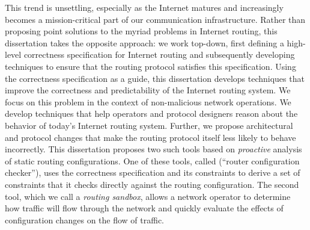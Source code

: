 This trend is unsettling, especially as the Internet matures and
increasingly becomes a mission-critical part of our communication
infrastructure.  Rather than proposing point solutions to the myriad
problems in Internet routing, this dissertation takes the opposite
approach: we work top-down, first defining a high-level correctness
specification for Internet routing and subsequently developing
techniques to ensure that the routing protocol satisfies this
specification.  Using the correctness specification as a guide, this
dissertation develops techniques that improve the correctness and
predictability of the Internet routing system. We focus on
this problem in the context of non-malicious network operations.  We
develop techniques that help operators and protocol designers reason
about the behavior of today's Internet 
routing system.  Further, we propose architectural and protocol changes
that make the routing protocol itself less likely to behave incorrectly.  This
dissertation proposes two such tools based on {\em proactive} analysis
of static routing configurations.  One of these tools, called \rcc
(``router configuration checker''), uses the correctness specification
and its constraints to derive a set of constraints that it checks
directly against the routing configuration.  The second tool, which we
call a {\em routing sandbox}, allows a network operator to determine how
traffic will flow through the network and quickly evaluate the effects
of configuration changes on the flow of traffic.




